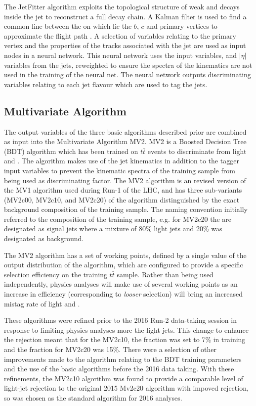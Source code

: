 		The JetFitter algorithm exploits the topological structure of weak \bhadron and \chadron decays inside the jet to reconstruct a full \bhadron decay chain. A Kalman filter is used to find a common line between the on which lie the $b$, $c$ and primary vertices to approximate the \bhadron flight path \cite{jetfitter}. A selection of variables relating to the primary vertex and the properties of the tracks associated with the jet are used as input nodes in a neural network. This neural network uses the input variables, \pt and $|\eta|$ variables from the jets, reweighted to ensure the spectra of the kinematics are not used in the training of the neural net. The neural network outputs discriminating variables relating to each jet flavour which are used to tag the jets. \cite{btagIdentification}

	\subsection{Multivariate Algorithm}
	\label{det:btag:mv}

	The output variables of the three basic algorithms described prior are combined as input into the Multivariate Algorithm MV2. MV2 is a Boosted Decision Tree (BDT) algorithm which has been trained on $t\bar{t}$ events to discriminate \bjets from light and \cjets. The algorithm makes use of the jet kinematics in addition to the tagger input variables to prevent the kinematic spectra of the training sample from being used as discriminating factor. The MV2 algorithm is an revised version of the MV1 algorithm used during Run-1 of the LHC, and has three sub-variants (MV2c00, MV2c10, and MV2c20) of the algorithm distinguished by the exact background composition of the training sample. The naming convention initially referred to the \cjet composition of the training sample, e.g. for MV2c20 the \bjets are designated as signal jets where a mixture of 80\% light jets and 20\% \cjets was designated as background.

	The MV2 algorithm has a set of working points, defined by a single value of the output distribution of the algorithm, which are configured to provide a specific \bjet selection efficiency on the training $t\bar{t}$ sample. Rather than being used independently, physics analyses will make use of several working points as an increase in \bjet efficiency (corresponding to \textit{looser} \bjet selection) will bring an increased mistag rate of light and \cjets.

	These algorithms were refined prior to the 2016 Run-2 data-taking session in response to \cjets limiting physics analyses more the light-jets. This change  to enhance the \cjet rejection meant that for the MV2c10, the \cjet fraction was set to 7\% in training and the fraction for MV2c20 was 15\%. There were a selection of other improvements made to the algorithm relating to the BDT training parameters and the use of the basic algorithms before the 2016 data taking. With these refinements, the MV2c10 algorithm was found to provide a comparable level of light-jet rejection to the original 2015 Mv2c20 algorithm with impoved \cjet rejection, so was chosen as the standard \btag algorithm for 2016 analyses. \cite{btagOptimisation}


